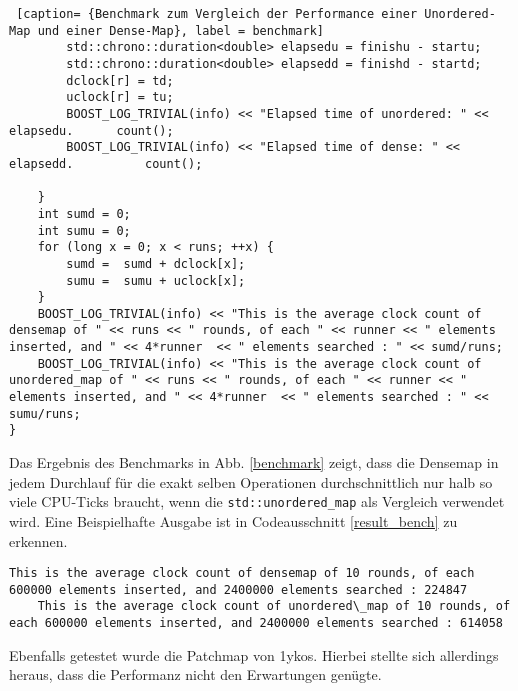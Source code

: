 \documentclass[../review_3.tex]{subfiles}
\begin{document}
\begin{lstlisting} [caption= {Benchmark zum Vergleich der Performance einer Unordered-Map und einer Dense-Map}, label = benchmark]
        std::chrono::duration<double> elapsedu = finishu - startu;
        std::chrono::duration<double> elapsedd = finishd - startd; 
        dclock[r] = td; 
        uclock[r] = tu; 
        BOOST_LOG_TRIVIAL(info) << "Elapsed time of unordered: " << elapsedu.      count();
        BOOST_LOG_TRIVIAL(info) << "Elapsed time of dense: " << elapsedd.          count();
        
    }
    int sumd = 0; 
    int sumu = 0; 
    for (long x = 0; x < runs; ++x) {
        sumd =  sumd + dclock[x]; 
        sumu =  sumu + uclock[x];
    }
    BOOST_LOG_TRIVIAL(info) << "This is the average clock count of densemap of " << runs << " rounds, of each " << runner << " elements inserted, and " << 4*runner  << " elements searched : " << sumd/runs;
    BOOST_LOG_TRIVIAL(info) << "This is the average clock count of unordered_map of " << runs << " rounds, of each " << runner << " elements inserted, and " << 4*runner  << " elements searched : " << sumu/runs;
} \end{lstlisting}
Das Ergebnis des Benchmarks in Abb. \ref{benchmark} zeigt, dass die Densemap in jedem Durchlauf für die exakt selben Operationen durchschnittlich nur halb so viele CPU-Ticks braucht, wenn die \texttt{std::unordered\_map} als Vergleich verwendet wird. Eine Beispielhafte Ausgabe ist in Codeausschnitt \ref{result_bench} zu erkennen.

\begin{lstlisting}[caption= {Beispielhaftes Ergebnis des Benchmarks zum Vergleich der Performance einer Unordered-Map und einer Dense-Map}, label = result_bench]
	This is the average clock count of densemap of 10 rounds, of each 600000 elements inserted, and 2400000 elements searched : 224847
	This is the average clock count of unordered\_map of 10 rounds, of each 600000 elements inserted, and 2400000 elements searched : 614058
\end{lstlisting}

Ebenfalls getestet wurde die Patchmap von 1ykos. Hierbei stellte sich allerdings heraus, dass die Performanz nicht den Erwartungen genügte.
\end{document}
